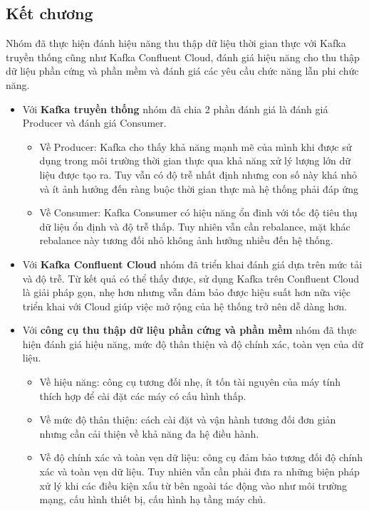 \subsection{Kết chương}
\noindent Nhóm đã thực hiện đánh hiệu năng thu thập dữ liệu thời gian thực với Kafka truyền thống cũng như Kafka Confluent Cloud, đánh giá hiệu năng cho thu thập dữ liệu phần cứng và phần mềm và đánh giá các yêu cầu chức năng lẫn phi chức năng.
\begin{itemize}[label=--]
    \item Với \textbf{Kafka truyền thống} nhóm đã chia 2 phần đánh giá là đánh giá Producer và đánh giá Consumer. 
    \begin{itemize}[label=\textbullet]
        \item Về Producer: Kafka cho thấy khả năng mạnh mẽ của mình khi được sử dụng trong môi trường thời gian thực qua khả năng xử lý lượng lớn dữ liệu được tạo ra. Tuy vẫn có độ trễ nhất định nhưng con số này khá nhỏ và ít ảnh hưởng đến ràng buộc thời gian thực mà hệ thống phải đáp ứng
        \item Về Consumer: Kafka Consumer có hiệu năng ổn đinh với tốc độ tiêu thụ dữ liệu ổn định và độ trễ thấp. Tuy nhiên vẫn cần rebalance, mặt khác rebalance này tương đối nhỏ không ảnh hưởng nhiều đến hệ thống.
    \end{itemize}
    \item Với \textbf{Kafka Confluent Cloud} nhóm đã triển khai đánh giá dựa trên mức tải và độ trễ. Từ kết quả có thể thấy được, sử dụng Kafka trên Confluent Cloud là giải pháp gọn, nhẹ hơn nhưng vẫn đảm bảo được hiệu suất hơn nữa việc triển khai với Cloud giúp việc mở rộng của hệ thống trở nên dễ dàng hơn.
    \item Với \textbf{công cụ thu thập dữ liệu phần cứng và phần mềm} nhóm đã thực hiện đánh giá hiệu năng, mức độ thân thiện và độ chính xác, toàn vẹn của dữ liệu.
    \begin{itemize}[label=\textbullet]
        \item Về hiệu năng: công cụ tương đối nhẹ, ít tốn tài nguyên của máy tính thích hợp để cài đặt các máy có cấu hình thấp.
        \item Về mức độ thân thiện: cách cài đặt và vận hành tương đối đơn giản nhưng cần cải thiện về khả năng đa hệ điều hành.
        \item Về độ chính xác và toàn vẹn dữ liệu: công cụ đảm bảo tương đối độ chính xác và toàn vẹn dữ liệu. Tuy nhiên vẫn cần phải đưa ra những biện pháp xử lý khi các điều kiện xấu từ bên ngoài tác động vào như môi trường mạng, cấu hình thiết bị, cấu hình hạ tầng máy chủ.

\end{itemize}
\end{itemize}

